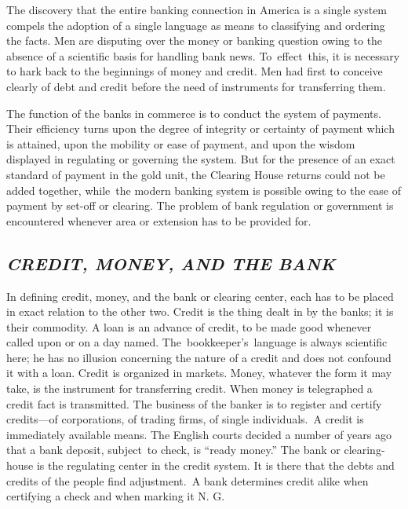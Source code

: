 \documentclass[twoside,symmetric,nobib,justified]{tufte-book}
\begin{document}
The discovery that the entire banking connection in America is a single
system compels the adoption of a single language as means to classifying
and ordering the facts. Men are disputing over the money or banking
question owing to the absence of a scientific basis for handling bank
news. To~effect~this, it is necessary to hark back to the beginnings of
money and credit. Men had first to conceive clearly of debt and credit
before the need of instruments for transferring them.~

The function of the banks in commerce is to conduct the system of
payments. Their efficiency turns upon the degree of integrity or
certainty of payment which is attained, upon the mobility or ease of
payment, and upon the wisdom displayed in regulating or governing the
system. But for the presence of an exact standard of payment in the gold
unit, the Clearing House returns could not be added together, while~the
modern banking system is possible owing to the ease of payment by
set-off or clearing. The problem of bank regulation or government is
encountered whenever area or extension has to be provided for.~ ~

\hypertarget{credit-money-and-the-bank}{%
\subsection{\texorpdfstring{\emph{CREDIT, MONEY, AND THE
BANK}}{CREDIT, MONEY, AND THE BANK}}\label{credit-money-and-the-bank}}

In defining credit, money, and the bank or clearing center, each has to
be placed in exact relation to the other two. Credit is the thing dealt
in by the banks; it is their commodity. A loan is an advance of credit,
to be made good whenever called upon or on a day named.
The~bookkeeper's~language is always scientific here; he has no illusion
concerning the nature of a credit and does not confound it with a loan.
Credit is organized in markets. Money, whatever the form it may take, is
the instrument for transferring credit. When money is telegraphed a
credit fact is transmitted. The business of the banker is to register
and certify credits---of corporations, of trading firms, of single
individuals.~A credit is immediately available means. The English courts
decided a number of years ago that a bank deposit, subject~to check, is
``ready money.'' The bank or clearing-house is the regulating center in
the credit system. It is there that the debts and credits of the people
find adjustment.~A bank determines credit alike when certifying a check
and when marking it N. G.~
\end{document}

